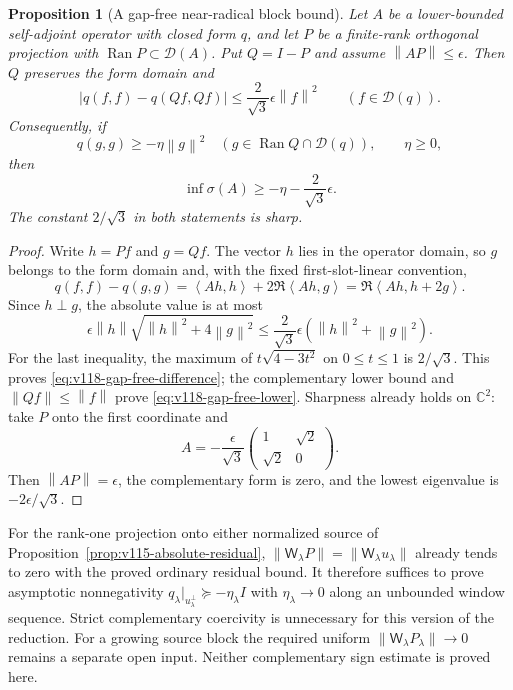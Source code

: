 \documentclass[11pt]{article}
\newtheorem{proposition}[theorem]{Proposition}
\theoremstyle{remark}
\newcommand{\norm}[1]{\left\lVert #1\right\rVert}
\newcommand{\ip}[2]{\left\langle #1,#2\right\rangle}
\begin{document}
\begin{proposition}[A gap-free near-radical block bound]
\label{prop:v118-gap-free}
Let $A$ be a lower-bounded self-adjoint operator with closed form $q$,
and let $P$ be a finite-rank orthogonal projection with
$\operatorname{Ran}P\subset\mathcal D(A)$.  Put $Q=I-P$ and assume
$\norm{AP}\le\epsilon$.  Then $Q$ preserves the form domain and
\begin{equation}\label{eq:v118-gap-free-difference}
 \left|q(f,f)-q(Qf,Qf)\right|
 \le\frac{2}{\sqrt3}\epsilon\norm f^2
 \qquad(f\in\mathcal D(q)).
\end{equation}
Consequently, if
\[
 q(g,g)\ge-\eta\norm g^2\quad
 (g\in\operatorname{Ran}Q\cap\mathcal D(q)),\qquad \eta\ge0,
\]
then
\begin{equation}\label{eq:v118-gap-free-lower}
 \inf\sigma(A)\ge-\eta-\frac{2}{\sqrt3}\epsilon.
\end{equation}
The constant $2/\sqrt3$ in both statements is sharp.
\end{proposition}
\begin{proof}
Write $h=Pf$ and $g=Qf$.  The vector $h$ lies in the operator domain,
so $g$ belongs to the form domain and, with the fixed first-slot-linear
convention,
\[
 q(f,f)-q(g,g)
 =\ip{Ah}{h}+2\Re\ip{Ah}{g}
 =\Re\ip{Ah}{h+2g}.
\]
Since $h\perp g$, the absolute value is at most
\[
 \epsilon\norm h\sqrt{\norm h^2+4\norm g^2}
 \le\frac{2}{\sqrt3}\epsilon
           (\norm h^2+\norm g^2).
\]
For the last inequality, the maximum of
$t\sqrt{4-3t^2}$ on $0\le t\le1$ is $2/\sqrt3$.
This proves \eqref{eq:v118-gap-free-difference}; the complementary
lower bound and $\norm{Qf}\le\norm f$ prove
\eqref{eq:v118-gap-free-lower}.  Sharpness already holds on
$\mathbb C^2$: take $P$ onto the first coordinate and
\[
 A=-\frac{\epsilon}{\sqrt3}
   \begin{pmatrix}1&\sqrt2\\\sqrt2&0\end{pmatrix}.
\]
Then $\norm{AP}=\epsilon$, the complementary form is zero, and the
lowest eigenvalue is $-2\epsilon/\sqrt3$.
\end{proof}

For the rank-one projection onto either normalized source of
Proposition~\ref{prop:v115-absolute-residual},
$\norm{\mathsf W_\lambda P}=\norm{\mathsf W_\lambda u_\lambda}$
already tends to zero with the proved ordinary residual bound.
It therefore suffices to prove asymptotic nonnegativity
$q_\lambda|_{u_\lambda^\perp}\succeq-\eta_\lambda I$ with
$\eta_\lambda\to0$ along an unbounded window sequence.  Strict
complementary coercivity is unnecessary for this version of the
reduction.  For a growing source block the required uniform
$\norm{\mathsf W_\lambda P_\lambda}\to0$ remains a separate open
input.  Neither complementary sign estimate is proved here.
\end{document}
